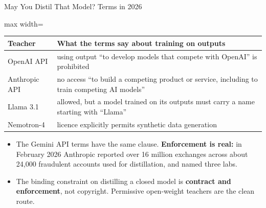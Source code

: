 \begin{frame}{May You Distil That Model? Terms in 2026}
    \begin{center}
    \small
    \begin{adjustbox}{max width=\linewidth}\begin{tabular}{l>{\raggedright\arraybackslash}p{10.2cm}}
        \toprule
        \textbf{Teacher} & \textbf{What the terms say about training on outputs} \\
        \midrule
        OpenAI API & using output ``to develop models that compete with OpenAI'' is prohibited \\
        Anthropic API & no access ``to build a competing product or service, including to train competing AI models'' \\
        Llama 3.1 & allowed, but a model trained on its outputs must carry a name starting with ``Llama'' \\
        \rowcolor{KAUSTcyan!12} Nemotron-4 & licence explicitly permits synthetic data generation \\
        \bottomrule
    \end{tabular}\end{adjustbox}
    \end{center}
    \begin{itemize}\itemsep0.4em
        \item The Gemini API terms have the same clause. \textbf{Enforcement is real:} in February 2026 Anthropic reported over 16 million exchanges across about 24,000 fraudulent accounts used for distillation, and named three labs.
        \item The binding constraint on distilling a closed model is \textbf{contract and enforcement}, not copyright. Permissive open-weight teachers are the clean route.
    \end{itemize}
\end{frame}

